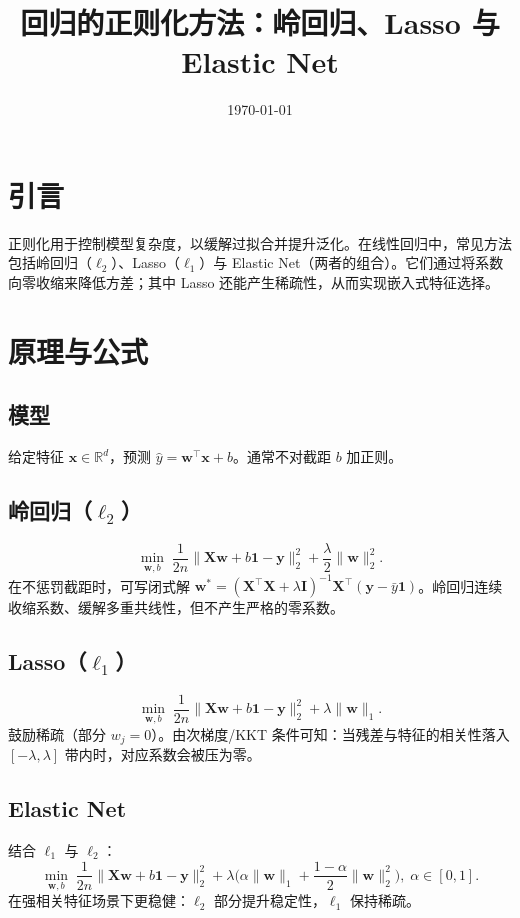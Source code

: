 \documentclass[UTF8,zihao=-4]{ctexart}
\title{回归的正则化方法：岭回归、Lasso 与 Elastic Net}
\author{}
\date{\today}
\begin{document}
\maketitle
\tableofcontents

\section{引言}
正则化用于控制模型复杂度，以缓解过拟合并提升泛化。在线性回归中，常见方法包括岭回归（\(\ell_2\)）、Lasso（\(\ell_1\)）与 Elastic Net（两者的组合）。它们通过将系数向零收缩来降低方差；其中 Lasso 还能产生稀疏性，从而实现嵌入式特征选择。

\section{原理与公式}
\subsection{模型}
给定特征 \(\mathbf{x}\in\mathbb{R}^d\)，预测 \(\hat{y}=\mathbf{w}^\top\mathbf{x}+b\)。通常不对截距 \(b\) 加正则。

\subsection{岭回归（\(\ell_2\)）}
\begin{equation}
\min_{\mathbf{w},b}\; \frac{1}{2n}\lVert \mathbf{X}\mathbf{w}+b\mathbf{1}-\mathbf{y} \rVert_2^2 + \frac{\lambda}{2}\lVert \mathbf{w} \rVert_2^2.
\end{equation}
在不惩罚截距时，可写闭式解 \(\mathbf{w}^*=(\mathbf{X}^\top\mathbf{X}+\lambda\mathbf{I})^{-1}\mathbf{X}^\top(\mathbf{y}-\bar{y}\mathbf{1})\)。岭回归连续收缩系数、缓解多重共线性，但不产生严格的零系数。

\subsection{Lasso（\(\ell_1\)）}
\begin{equation}
\min_{\mathbf{w},b}\; \frac{1}{2n}\lVert \mathbf{X}\mathbf{w}+b\mathbf{1}-\mathbf{y} \rVert_2^2 + \lambda \lVert \mathbf{w} \rVert_1.
\end{equation}
鼓励稀疏（部分 \(w_j=0\)）。由次梯度/KKT 条件可知：当残差与特征的相关性落入 \([-\lambda,\lambda]\) 带内时，对应系数会被压为零。

\subsection{Elastic Net}
结合 \(\ell_1\) 与 \(\ell_2\)：
\begin{equation}
\min_{\mathbf{w},b}\; \frac{1}{2n}\lVert \mathbf{X}\mathbf{w}+b\mathbf{1}-\mathbf{y} \rVert_2^2 + \lambda\Big(\alpha\lVert \mathbf{w} \rVert_1 + \frac{1-\alpha}{2}\lVert \mathbf{w} \rVert_2^2\Big),\; \alpha\in[0,1].
\end{equation}
在强相关特征场景下更稳健：\(\ell_2\) 部分提升稳定性，\(\ell_1\) 保持稀疏。
\end{document}
